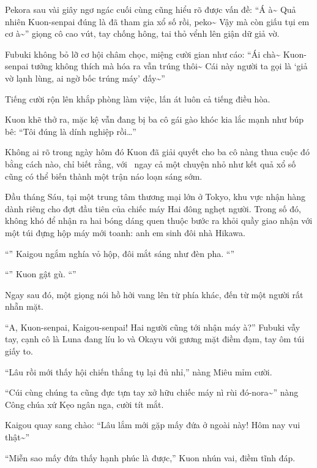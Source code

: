 \documentclass[../main.tex]{subfiles}
\begin{document}
Pekora sau vài giây ngơ ngác cuối cùng cũng hiểu rõ được vấn đề: ``Á à\~{} Quả nhiên Kuon-senpai đúng là đã tham gia xổ số rồi, peko\~{} Vậy mà còn giấu tụi em cơ à\~{}'' giọng cô cao vút, tay chống hông, tai thỏ vểnh lên giận dữ giả vờ.

Fubuki không bỏ lỡ cơ hội châm chọc, miệng cười gian như cáo: ``Ái chà\~{} Kuon-senpai tưởng không thích mà hóa ra vẫn trúng thôi\~{} Cái này người ta gọi là `giả vờ lạnh lùng, ai ngờ bốc trúng máy' đấy\~{}''

Tiếng cười rộn lên khắp phòng làm việc, lấn át luôn cả tiếng điều hòa.

Kuon khẽ thở ra, mặc kệ vẫn đang bị ba cô gái gào khóc kia lắc mạnh như búp bê: ``Tôi đúng là dính nghiệp rồi\dots''

Không ai rõ trong ngày hôm đó Kuon đã giải quyết cho ba cô nàng thua cuộc đó bằng cách nào, chỉ biết rằng, với \hll\, ngay cả một chuyện nhỏ như kết quả xổ số cũng có thể biến thành một trận náo loạn sáng sớm.

\omk

Đầu tháng Sáu, tại một trung tâm thương mại lớn ở Tokyo, khu vực nhận hàng dành riêng cho đợt đầu tiên của chiếc máy Hai đông nghẹt người. Trong số đó, không khó để nhận ra hai bóng dáng quen thuộc bước ra khỏi quầy giao nhận với một túi đựng hộp máy mới toanh: anh em sinh đôi nhà Hikawa.

``'' Kaigou ngắm nghía vỏ hộp, đôi mắt sáng như đèn pha. ``''

``'' Kuon gật gù. ``''

Ngay sau đó, một giọng nói hồ hởi vang lên từ phía khác, đến từ một người rất nhẵn mặt.

``A, Kuon-senpai, Kaigou-senpai! Hai người cũng tới nhận máy à?'' Fubuki vẫy tay, cạnh cô là Luna đang líu lo và Okayu với gương mặt điềm đạm, tay ôm túi giấy to.

``Lâu rồi mới thấy hội chiến thắng tụ lại đủ nhỉ,'' nàng Miêu mỉm cười.

``Cúi cùng chúng ta cũng đực tựn tay xở hữu chiếc máy nì rùi đó-nora\~{}'' nàng Công chúa xứ Kẹo ngân nga, cười tít mắt.

Kaigou quay sang chào: ``Lâu lắm mới gặp mấy đứa ở ngoài này! Hôm nay vui thật\~{}''

``Miễn sao mấy đứa thấy hạnh phúc là được,'' Kuon nhún vai, điềm tĩnh đáp.
\end{document}

